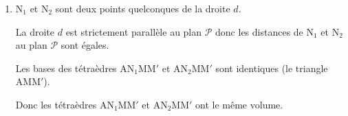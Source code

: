 \begin{enumerate}[resume]
\begin{enumerate}
L'aire de la base, c'est-à-dire AMM$'$ vaut $\dfrac{1}{2}\times\text{AM}\times \text{MM}' = \dfrac{\sqrt{5}\times \sqrt{6}}{2}=\dfrac{\sqrt{30}}{2}$.

Le volume du tétraèdre vaut donc $\dfrac{1}{3}\times \dfrac{\sqrt{30}}{2}\times \ell = \dfrac{\ell\sqrt{30}}{6}$.

		\item N$_1$ et N$_2$ sont deux points quelconques de la droite $d$.
		
La droite $d$ est strictement parallèle au plan $\mathcal{P}$ donc les distances de N$_1$ et N$_2$ au plan $\mathcal{P}$ sont égales.

Les bases des  tétraèdres AN$_1$MM$'$ et AN$_2$MM$'$ sont identiques (le triangle AMM$'$).

Donc les tétraèdres AN$_1$MM$'$ et AN$_2$MM$'$ ont le même volume.
		
	\end{enumerate}
\end{enumerate}
